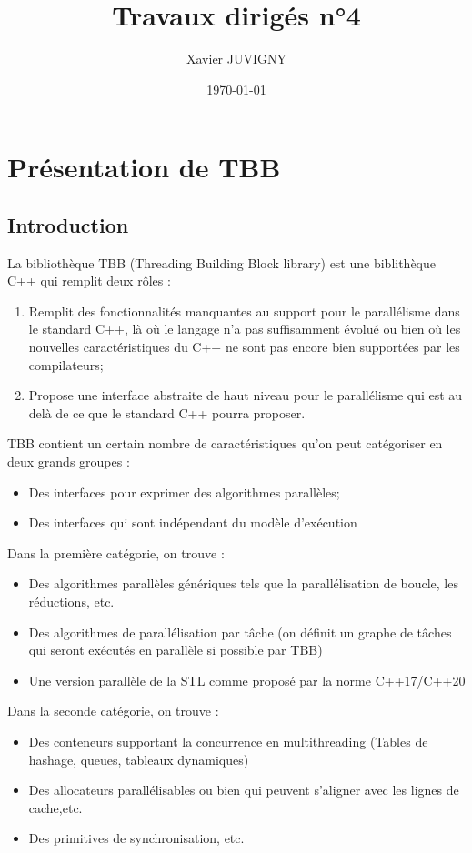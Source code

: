 \documentclass[11pt,a4paper]{article}
\author{Xavier JUVIGNY}
\date{\today}
\title{Travaux dirigés n°4}
\begin{document}
\maketitle
\tableofcontents

\section{Présentation de TBB}

\subsection{Introduction}

La bibliothèque TBB (Threading Building Block library) est une biblithèque C++ qui remplit deux rôles :
\begin{enumerate}
    \item Remplit des fonctionnalités manquantes au support pour le parallélisme dans le standard C++, là où le langage n'a pas
          suffisamment évolué ou bien où les nouvelles caractéristiques du C++ ne sont pas encore bien supportées par les
          compilateurs;
    \item Propose une interface abstraite de haut niveau pour le parallélisme qui est au delà de ce que le standard C++ pourra
          proposer. 
\end{enumerate}

TBB contient un certain nombre de caractéristiques qu'on peut catégoriser en deux grands groupes :
\begin{itemize}
    \item Des interfaces pour exprimer des algorithmes parallèles;
    \item Des interfaces qui sont indépendant du modèle d'exécution
\end{itemize}

Dans la première catégorie, on trouve :
\begin{itemize}
    \item Des algorithmes parallèles génériques tels que la parallélisation de boucle, les réductions, etc.
    \item Des algorithmes de parallélisation par tâche (on définit un graphe de tâches qui seront exécutés en parallèle si possible par TBB)
    \item Une version parallèle de la STL comme proposé par la norme C++17/C++20
\end{itemize}

Dans la seconde catégorie, on trouve :
\begin{itemize}
    \item Des conteneurs supportant la concurrence en multithreading (Tables de hashage, queues, tableaux dynamiques)
    \item Des allocateurs parallélisables ou bien qui peuvent s'aligner avec les lignes de cache,etc.
    \item Des primitives de synchronisation, etc.
\end{itemize}
\end{document}

